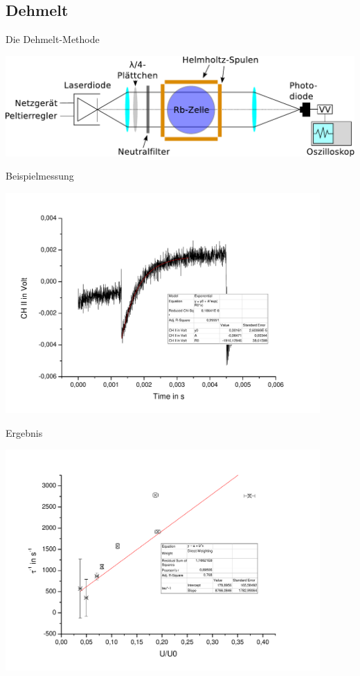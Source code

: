 \documentclass{beamer}
\begin{document}
\subsection{Dehmelt}
\begin{frame}{Die Dehmelt-Methode}
\begin{center}
\centering \includegraphics[width=\textwidth]{Bilder/ABDehmelt.pdf}
\end{center}
\end{frame}

\begin{frame}{Beispielmessung}
\begin{center}
\centering \includegraphics[width=0.9\textwidth]{Bilder/Dehmeltbsp.pdf}
\end{center}
\end{frame}

\begin{frame}{Ergebnis}
\begin{center}
\centering \includegraphics[width=0.9\textwidth]{Bilder/Dehmelt.pdf}
\end{center}
\end{frame}
\end{document}
